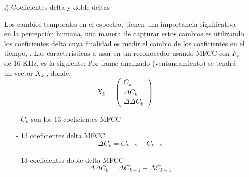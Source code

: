 \begin{enumerate}
\item[i)]Coeficientes delta y doble deltas
\par
Los cambios temporales en el espectro, tienen una importancia significativa en la percepción humana, una manera de capturar estos cambios es utilizando los coeficientes delta cuya finalidad es medir el cambio de los coeficientes en el tiempo, \cite{xuedong}. Las características a usar en un reconocedor usando MFCC con $F_{s}$ de 16 KHz, es la siguiente:
\vskip 0.5cm
Por frame analizado (ventaneamiento) se tendrá un vector $X_{k}$ , donde:
\begin{equation}
\label{eq:ecuacion66}
X_{k} = 
\begin{pmatrix}
C_{k}\\ 
\Delta C_{k}\\ 
\Delta \Delta C_{k}
\end{pmatrix}
\end{equation}

\begin{enumerate}
\item[-]$C_k$ son los 13 coeficientes MFCC 
\item[-]13 coeficientes delta MFCC
\begin{equation}
\label{eq:ecuacion67}
\Delta C_{k} = C_{k + 2} - C_{k - 2}
\end{equation}
\item[-]13 coeficientes doble delta MFCC
\begin{equation}
\label{eq:ecuacion68}
\Delta \Delta C_{k} = \Delta C_{k + 1} - \Delta C_{k - 1}
\end{equation}
\end{enumerate}
\end{enumerate}


